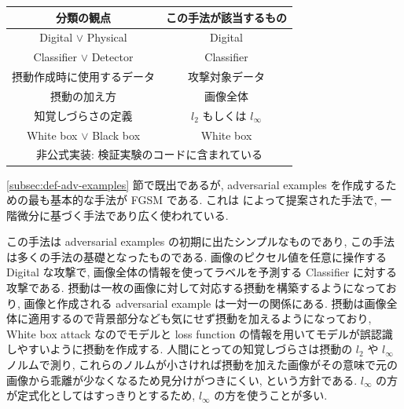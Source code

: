 \begin{table}[htbp]
\begin{center}
\begin{tabular}{|c|c|}
\hline
分類の観点 & この手法が該当するもの \\
\hline
Digital $\lor$ Physical & Digital \\
Classifier $\lor$ Detector & Classifier \\
摂動作成時に使用するデータ & 攻撃対象データ \\
摂動の加え方 & 画像全体 \\
知覚しづらさの定義 & $l_2$ もしくは $l_\infty$ \\
White box $\lor$ Black box & White box \\
\hline
\multicolumn{2}{|c|}{非公式実装: 検証実験のコードに含まれている} \\
\hline
\end{tabular}
\label{tb:fgsm-summary}
\end{center}
\end{table}

\ref{subsec:def-adv-examples} 節で既出であるが, adversarial examples を作成するための最も基本的な手法が FGSM である.
これは \cite{goodfellow2014explaining} によって提案された手法で, 一階微分に基づく手法であり広く使われている.

この手法は adversarial examples の初期に出たシンプルなものであり, この手法は多くの手法の基礎となったものである.
画像のピクセル値を任意に操作する Digital な攻撃で, 画像全体の情報を使ってラベルを予測する Classifier に対する攻撃である.
摂動は一枚の画像に対して対応する摂動を構築するようになっており, 画像と作成される adversarial example は一対一の関係にある.
摂動は画像全体に適用するので背景部分なども気にせず摂動を加えるようになっており, White box attack なのでモデルと loss function の情報を用いてモデルが誤認識しやすいように摂動を作成する.
人間にとっての知覚しづらさは摂動の $l_2$ や $l_{\infty}$ ノルムで測り, これらのノルムが小さければ摂動を加えた画像がその意味で元の画像から乖離が少なくなるため見分けがつきにくい, という方針である.
$l_{\infty}$ の方が定式化としてはすっきりとするため, $l_{\infty}$ の方を使うことが多い.

